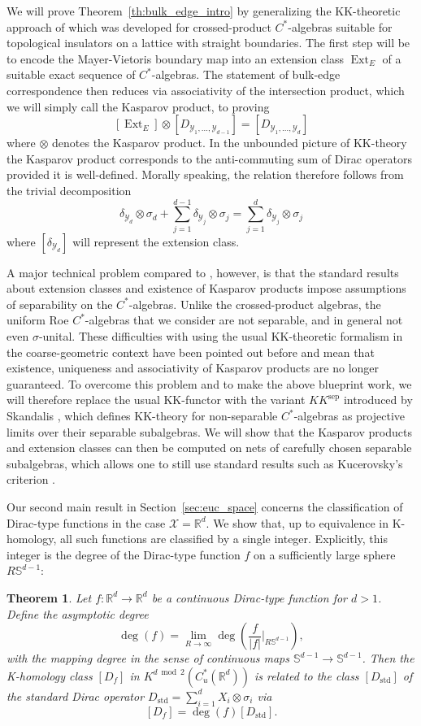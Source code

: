 \documentclass[12pt]{amsart}
\newtheorem{theorem}{Theorem}[section]
\newcommand{\RM}{{\mathbb R}}
\newcommand{\SM}{{\mathbb S}}
\newcommand{\Xx}{{\mathcal X}}
\newcommand{\Yy}{{\mathcal Y}}
\DeclareMathOperator*{\Ext}{Ext}
\begin{document}
We will prove Theorem~\ref{th:bulk_edge_intro} by generalizing the  KK-theoretic approach of \cite{bourne2017k} which was developed for crossed-product $C^*$-algebras suitable for topological insulators on a lattice with straight boundaries. The first step will be to encode the Mayer-Vietoris boundary map into an extension class $\Ext_E$ of a suitable exact sequence of $C^*$-algebras. The statement of bulk-edge correspondence then reduces via associativity of the intersection product, which we will simply call the Kasparov product, to proving
$$[{\Ext}_E] \otimes [D_{\Yy_1,\ldots,\Yy_{d-1}}] = [D_{\Yy_1,\ldots,\Yy_{d}}]$$
where $\otimes$ denotes the Kasparov product. In the unbounded picture of KK-theory the Kasparov product corresponds to the anti-commuting sum of Dirac operators provided it is well-defined. Morally speaking, the relation therefore follows from the trivial decomposition
$$\delta_{\Yy_d} \otimes \sigma_d + \sum_{j=1}^{d-1} \delta_{\Yy_j} \otimes \sigma_j = \sum_{j=1}^d \delta_{\Yy_j} \otimes \sigma_j $$
where $[\delta_{\Yy_d}]$ will represent the extension class.

A major technical problem compared to \cite{bourne2017k}, however, is that the standard results about extension classes and existence of Kasparov products impose assumptions of separability on the $C^*$-algebras. Unlike the crossed-product algebras, the uniform Roe $C^*$-algebras that we consider are not separable, and in general not even $\sigma$-unital. These difficulties with using the usual KK-theoretic formalism in the coarse-geometric context have been pointed out before \cite[Remark~1.5]{SpakulaWillett2013} and mean that existence, uniqueness and associativity of Kasparov products are no longer guaranteed. To overcome this problem and to make the above blueprint work, we will therefore replace the usual KK-functor with the variant $KK^{\mathrm{sep}}$ introduced by Skandalis \cite{Skandalis1988}, which defines KK-theory for non-separable $C^*$-algebras as projective limits over their separable subalgebras. We will show that the Kasparov products and extension classes can then be computed on nets of carefully chosen separable subalgebras, which allows one to still use standard results such as Kucerovsky's criterion \cite{Kucerovsky}. 

Our second main result in Section~\ref{sec:euc_space} concerns the classification of Dirac-type functions in the case $\Xx=\RM^d$. We show that, up to equivalence in K-homology, all such functions are classified by a single integer.
Explicitly, this integer is the degree of the Dirac-type function $f$ on a sufficiently large sphere $R\SM^{d-1}$:
\begin{theorem}\label{thm:degree_intro}
Let $f:\RM^d\to \RM^d$ be a continuous Dirac-type function for $d > 1$. Define the asymptotic degree 
\[\deg(f)= \lim_{R\to \infty} \deg\left( \frac{f}{|f|}\bigg\vert_{R\SM^{d-1}}\right),\]
with the mapping degree in the sense of continuous maps $\SM^{d-1}\to \SM^{d-1}$. 
Then the K-homology class $[D_f]$ in $K^{d \bmod 2}(C^*_u(\RM^d))$ is related to the class $[D_{\mathrm{std}}]$ of the standard Dirac operator $D_{\mathrm{std}}=\sum_{i=1}^d X_i\otimes \sigma_i$ via $$[D_f]= \deg(f)[D_{\mathrm{std}}].$$
\end{theorem}
\end{document}
